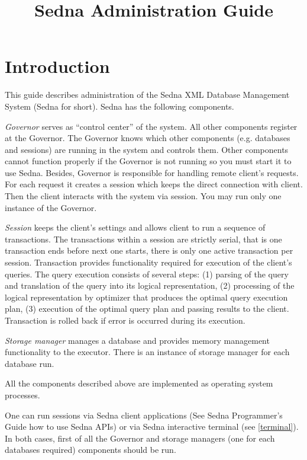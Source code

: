 \documentclass[a4paper,12pt]{article}
\title{Sedna Administration Guide}
\date{}
\newcommand{\TocAt}[6]{}
\begin{document}
\sloppy
\maketitle
\TocAt*{section,subsection,subsubsection}
\TocAt*{subsection,subsubsection}
\tableofcontents

\section{Introduction}
This guide describes administration of the Sedna XML Database Management System (Sedna for short). Sedna has the following components.

\emph{Governor} serves as  ``control center'' of the system. All other components register at the Governor. The Governor knows which other components (e.g. databases and sessions) are running in the system and controls them. Other components cannot function properly if the Governor is not running so you must start it to use Sedna. Besides, Governor is responsible for handling remote client's requests. For each request it creates a session which keeps the direct connection with client. Then the client interacts with the system via session. You may run only one instance of the Governor.


\emph{Session} keeps the client's settings and allows client to run a sequence of transactions. The transactions within a session are strictly serial, that is one transaction ends before next one starts, there is only one active transaction per session. Transaction provides functionality required for execution of the client's queries. The query execution consists of several steps: (1) parsing of the query and translation of the query into its logical representation, (2) processing of the logical representation by optimizer that produces the optimal query execution plan, (3) execution of the optimal query plan and passing results to the client. Transaction is rolled back if error is occurred during its execution.

\emph{Storage manager} manages a database and provides memory management functionality to the executor. There is an instance of storage manager for each database run. 

All the components described above are implemented as operating system processes.
 

One can run sessions via Sedna client applications (See Sedna Programmer's Guide how to use Sedna APIs) or via Sedna interactive terminal (see \ref{terminal}). In both cases, first of all the Governor and storage managers (one for each databases required) components should be run.
\end{document}
